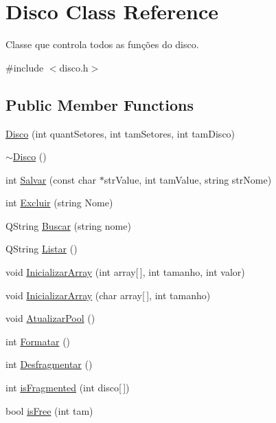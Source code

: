 \hypertarget{classDisco}{\section{Disco Class Reference}
\label{classDisco}
}


Classe que controla todos as funções do disco.  




{\ttfamily \#include $<$disco.\+h$>$}

\subsection*{Public Member Functions}
\begin{DoxyCompactItemize}
\item 
\hyperlink{classDisco_a8f87658574d2528cb32b4c975716fa38}{Disco} (int quant\+Setores, int tam\+Setores, int tam\+Disco)
\item 
\hyperlink{classDisco_a9e8131123ed8969c7608ce877c765029}{$\sim$\+Disco} ()
\item 
int \hyperlink{classDisco_af09da728510fdb43fa68430e743ab7c4}{Salvar} (const char $\ast$str\+Value, int tam\+Value, string str\+Nome)
\item 
int \hyperlink{classDisco_ae9ed7d8acb5337a471c37f90de72aeee}{Excluir} (string Nome)
\item 
Q\+String \hyperlink{classDisco_a087a7b5e2524e8e49a984633ee9b6df2}{Buscar} (string nome)
\item 
Q\+String \hyperlink{classDisco_a3b6171128d70b61f64f6c8eb1e9912f9}{Listar} ()
\item 
void \hyperlink{classDisco_a9d47269b52e2b2d5d73f28321687c591}{Inicializar\+Array} (int array\mbox{[}$\,$\mbox{]}, int tamanho, int valor)
\item 
void \hyperlink{classDisco_a074de498eae7bf3073bd6abf6f2169d0}{Inicializar\+Array} (char array\mbox{[}$\,$\mbox{]}, int tamanho)
\item 
void \hyperlink{classDisco_a8ea8c8b8df931b1bf74a967ed694fa45}{Atualizar\+Pool} ()
\item 
int \hyperlink{classDisco_a94f70ad19848fd60993332fa2f56a594}{Formatar} ()
\item 
int \hyperlink{classDisco_ac12c64821a3e4f617ff584f587471e85}{Desfragmentar} ()
\item 
int \hyperlink{classDisco_a3f557c45c79a1e571af9bb2688090aa4}{is\+Fragmented} (int disco\mbox{[}$\,$\mbox{]})
\item 
bool \hyperlink{classDisco_a878eccb7cbd9c0e7c04452cad7bfbfb5}{is\+Free} (int tam)

\end{DoxyCompactItemize}
